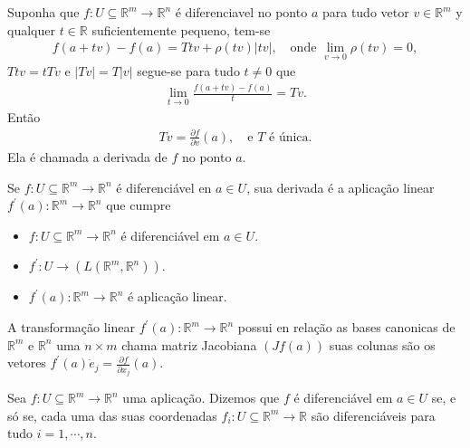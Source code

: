 \begin{definition}
  Suponha que $f:U\subseteq \mathbb{R}^{m}\to\mathbb{R}^{n}$ é diferenciavel no ponto $a$ para tudo vetor $v\in\mathbb{R}^{m}$ y qualquer $t\in\mathbb{R}$ suficientemente pequeno, tem-se
  \begin{align*}
    f(a+tv)-f(a)=Ttv+\rho(tv)|tv|,\quad\text{onde }\lim_{v \to 0}\rho(tv)=0,
  \end{align*}
  $Ttv=tTv$ e $|Tv|=T|v|$ segue-se para tudo $t\neq 0$ que
  \begin{align*}
    \lim_{t \to 0}\frac{f(a+tv)-f(a)}{t}=Tv.
  \end{align*}
  Então
  \begin{align*}
    Tv=\frac{\partial f}{\partial v}(a),\quad\text{e $T$ é única.}
  \end{align*}
  Ela é chamada a derivada de $f$ no ponto $a$. 
\end{definition}
\begin{note}
  Se $f:U\subseteq \mathbb{R}^{m}\to\mathbb{R}^{n}$ é diferenciável en $a\in U$, sua derivada é a aplicação linear $f^\prime(a):\mathbb{R}^{m}\to\mathbb{R}^{n}$ que cumpre
  \begin{itemize}
    \item $f:U\subseteq \mathbb{R}^{m}\to\mathbb{R}^{n}$ é diferenciável em $a\in U$.
    \item $f^\prime:U\to(L(\mathbb{R}^{m},\mathbb{R}^{n}))$.
    \item $f^\prime(a):\mathbb{R}^{m}\to\mathbb{R}^{n}$ é aplicação linear. 
    \end{itemize}
\end{note}
\begin{note}
  A transformação linear $f^\prime(a):\mathbb{R}^{m}\to\mathbb{R}^{n}$ possui en relação as bases canonicas de $\mathbb{R}^{m}$ e $\mathbb{R}^{n}$ uma $n\times m$ chama matriz Jacobiana $(Jf(a))$ suas colunas são os vetores $f^\prime(a)\dot e_{j}=\frac{\partial f}{\partial x_{j}}(a)$. 
\end{note}
\begin{note}
  Sea $f:U\subseteq \mathbb{R}^{m}\to\mathbb{R}^{n}$ uma aplicação. Dizemos que $f$ é diferenciável em $a\in U$ se, e só se, cada uma das suas coordenadas $f_i:U\subseteq \mathbb{R}^{m}\to\mathbb{R}$ são diferenciáveis para tudo $i=1,\cdots,n$. 
\end{note}
